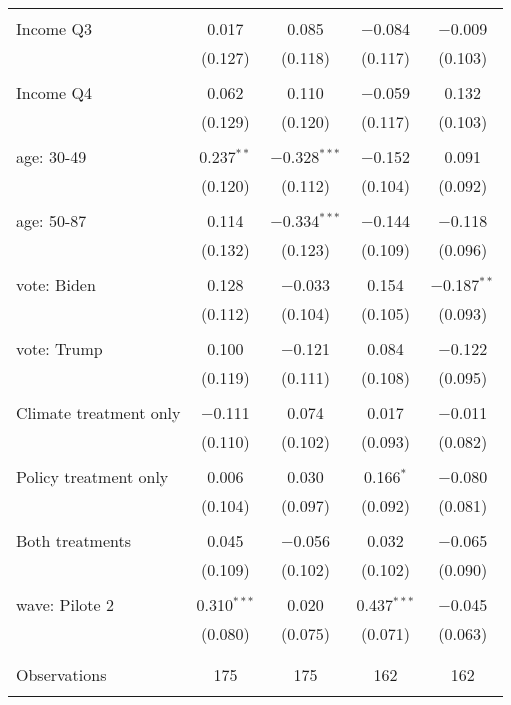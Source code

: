 \begin{tabular}{@{\extracolsep{5pt}}lcccc}
  & & & & \\ 
 Income Q3 & 0.017 & 0.085 & $-$0.084 & $-$0.009 \\ 
  & (0.127) & (0.118) & (0.117) & (0.103) \\ 
  & & & & \\ 
 Income Q4 & 0.062 & 0.110 & $-$0.059 & 0.132 \\ 
  & (0.129) & (0.120) & (0.117) & (0.103) \\ 
  & & & & \\ 
 age: 30-49 & 0.237$^{**}$ & $-$0.328$^{***}$ & $-$0.152 & 0.091 \\ 
  & (0.120) & (0.112) & (0.104) & (0.092) \\ 
  & & & & \\ 
 age: 50-87 & 0.114 & $-$0.334$^{***}$ & $-$0.144 & $-$0.118 \\ 
  & (0.132) & (0.123) & (0.109) & (0.096) \\ 
  & & & & \\ 
 vote: Biden & 0.128 & $-$0.033 & 0.154 & $-$0.187$^{**}$ \\ 
  & (0.112) & (0.104) & (0.105) & (0.093) \\ 
  & & & & \\ 
 vote: Trump & 0.100 & $-$0.121 & 0.084 & $-$0.122 \\ 
  & (0.119) & (0.111) & (0.108) & (0.095) \\ 
  & & & & \\ 
 Climate treatment only & $-$0.111 & 0.074 & 0.017 & $-$0.011 \\ 
  & (0.110) & (0.102) & (0.093) & (0.082) \\ 
  & & & & \\ 
 Policy treatment only & 0.006 & 0.030 & 0.166$^{*}$ & $-$0.080 \\ 
  & (0.104) & (0.097) & (0.092) & (0.081) \\ 
  & & & & \\ 
 Both treatments & 0.045 & $-$0.056 & 0.032 & $-$0.065 \\ 
  & (0.109) & (0.102) & (0.102) & (0.090) \\ 
  & & & & \\ 
 wave: Pilote 2 & 0.310$^{***}$ & 0.020 & 0.437$^{***}$ & $-$0.045 \\ 
  & (0.080) & (0.075) & (0.071) & (0.063) \\ 
  & & & & \\ 
\hline \\[-1.8ex] 

Observations & 175 & 175 & 162 & 162 \\ 
\hline 
\hline \\[-1.8ex] 
\end{tabular} 